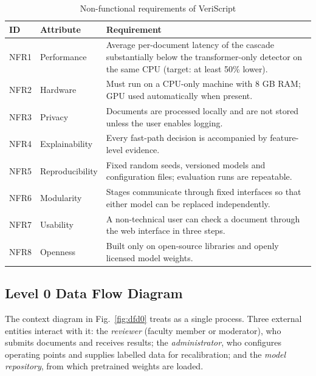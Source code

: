 \begin{table}[H]
\caption{Non-functional requirements of VeriScript}
\label{tab:nfr}
\centering
\small
\begin{tabularx}{\textwidth}{|p{1.0cm}|p{2.8cm}|L|}
\hline
\textbf{ID} & \textbf{Attribute} & \textbf{Requirement} \\ \hline
NFR1 & Performance & Average per-document latency of the cascade substantially below the transformer-only detector on the same CPU (target: at least 50\% lower). \\ \hline
NFR2 & Hardware & Must run on a CPU-only machine with 8 GB RAM; GPU used automatically when present. \\ \hline
NFR3 & Privacy & Documents are processed locally and are not stored unless the user enables logging. \\ \hline
NFR4 & Explainability & Every fast-path decision is accompanied by feature-level evidence. \\ \hline
NFR5 & Reproducibility & Fixed random seeds, versioned models and configuration files; evaluation runs are repeatable. \\ \hline
NFR6 & Modularity & Stages communicate through fixed interfaces so that either model can be replaced independently. \\ \hline
NFR7 & Usability & A non-technical user can check a document through the web interface in three steps. \\ \hline
NFR8 & Openness & Built only on open-source libraries and openly licensed model weights. \\ \hline
\end{tabularx}
\end{table}

\subsection{Level 0 Data Flow Diagram}

The context diagram in Fig.~\ref{fig:dfd0} treats \veriscript{} as a single
process. Three external entities interact with it: the \emph{reviewer}
(faculty member or moderator), who submits documents and receives results;
the \emph{administrator}, who configures operating points and supplies labelled
data for recalibration; and the \emph{model repository}, from which pretrained
weights are loaded.

